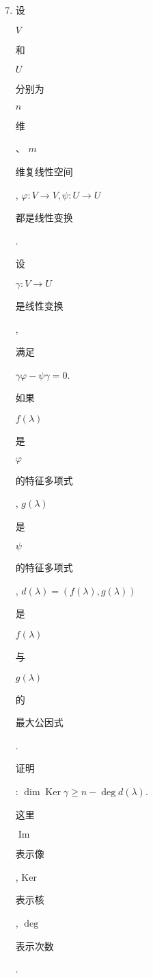 \documentclass[10pt]{article}
\begin{document}
\begin{enumerate}
  \setcounter{enumi}{6}
  \item \begin{CJK}{UTF8}{mj}设\end{CJK} $V$ \begin{CJK}{UTF8}{mj}和\end{CJK} $U$ \begin{CJK}{UTF8}{mj}分别为\end{CJK} $n$ \begin{CJK}{UTF8}{mj}维\end{CJK}、 $m$ \begin{CJK}{UTF8}{mj}维复线性空间\end{CJK}, $\varphi: V \rightarrow V, \psi: U \rightarrow U$ \begin{CJK}{UTF8}{mj}都是线性变换\end{CJK}. \begin{CJK}{UTF8}{mj}设\end{CJK} $\gamma: V \rightarrow U$ \begin{CJK}{UTF8}{mj}是线性变换\end{CJK}, \begin{CJK}{UTF8}{mj}满足\end{CJK} $\gamma \varphi-\psi \gamma=0$. \begin{CJK}{UTF8}{mj}如果\end{CJK} $f(\lambda)$ \begin{CJK}{UTF8}{mj}是\end{CJK} $\varphi$ \begin{CJK}{UTF8}{mj}的特征多项式\end{CJK}, $g(\lambda)$ \begin{CJK}{UTF8}{mj}是\end{CJK} $\psi$ \begin{CJK}{UTF8}{mj}的特征多项式\end{CJK}, $d(\lambda)=(f(\lambda), g(\lambda))$ \begin{CJK}{UTF8}{mj}是\end{CJK} $f(\lambda)$ \begin{CJK}{UTF8}{mj}与\end{CJK} $g(\lambda)$ \begin{CJK}{UTF8}{mj}的\end{CJK} \begin{CJK}{UTF8}{mj}最大公因式\end{CJK}. \begin{CJK}{UTF8}{mj}证明\end{CJK}: $\operatorname{dim} \operatorname{Ker} \gamma \geqslant n-\operatorname{deg} d(\lambda)$. \begin{CJK}{UTF8}{mj}这里\end{CJK} $\operatorname{Im}$ \begin{CJK}{UTF8}{mj}表示像\end{CJK}, Ker \begin{CJK}{UTF8}{mj}表示核\end{CJK}, $\operatorname{deg}$ \begin{CJK}{UTF8}{mj}表示次数\end{CJK}.


\end{enumerate}
\end{document}
